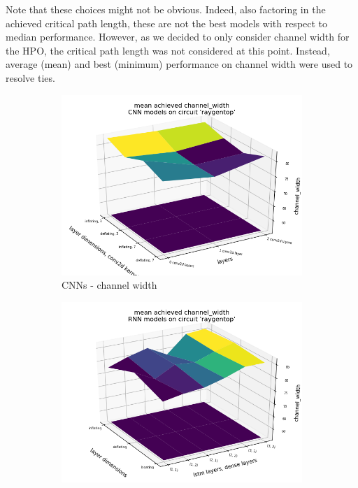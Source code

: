 Note that these choices might not be obvious. Indeed, also factoring in the achieved critical path length, these are not the best models with respect to median performance. However, as we decided to only consider channel width for the \gls{HPO}, the critical path length was not considered at this point. Instead, average (mean) and best (minimum) performance on channel width were used to resolve ties.

\begin{figure}
	\begin{subfigure}[b]{0.49\linewidth}
		\includegraphics[width=\linewidth]{plots/cnn-hyperopt-chan-width-with-reference.png}
		\caption{\glspl{CNN} - channel width}
	\end{subfigure}
	\begin{subfigure}[b]{0.49\linewidth}
		\includegraphics[width=\linewidth]{plots/rnn-hyperopt-chan-width-with-reference.png}

\end{subfigure}
\end{figure}
